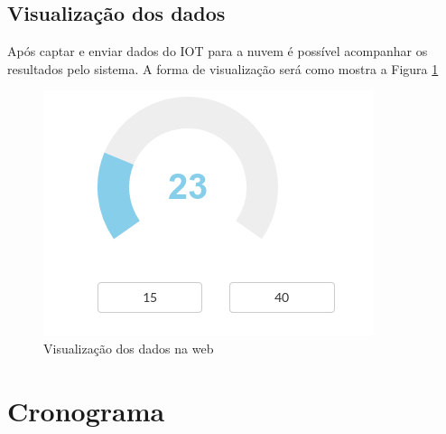 \subsection{Visualização dos dados}\label{visualizauxe7uxe3o-dos-dados}

Após captar e enviar dados do IOT para a nuvem é possível acompanhar os
resultados pelo sistema. A forma de visualização será como mostra a
Figura \ref{fig:view-monitor}

\begin{figure}[h]
    \includegraphics[scale=0.5]{img/wm-monitor-temperature.png}
    \caption{Visualização dos dados na web} \label{fig:view-monitor}
\end{figure}

\section{Cronograma}\label{cronograma}


